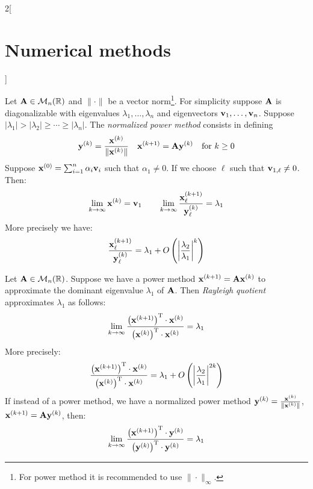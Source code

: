\documentclass[../../../main.tex]{subfiles}
\begin{document}
\begin{multicols}{2}[\section{Numerical methods}]
\begin{method}
    \end{method}
    \begin{method}
        Let $\boldsymbol{\mathrm{A}}\in\mathcal{M}_n(\mathbb{R})$ and $\|\cdot\|$ be a vector norm\footnote{For power method it is recommended to use $\|\cdot\|_\infty$.}. For simplicity suppose $\boldsymbol{\mathrm{A}}$ is diagonalizable with eigenvalues $\lambda_1,\ldots,\lambda_n$ and eigenvectors $\boldsymbol{\mathrm{v}}_1,\ldots,\boldsymbol{\mathrm{v}}_n$. Suppose $|\lambda_1|>|\lambda_2|\geq\cdots\geq|\lambda_n|$. The \textit{normalized power method} consists in defining $$\boldsymbol{\mathrm{y}}^{(k)}=\frac{\boldsymbol{\mathrm{x}}^{(k)}}{\|\boldsymbol{\mathrm{x}}^{(k)}\|}\quad\boldsymbol{\mathrm{x}}^{(k+1)}=\boldsymbol{\mathrm{A}}\boldsymbol{\mathrm{y}}^{(k)}\quad\text{for }k\geq 0$$ Suppose $\boldsymbol{\mathrm{x}}^{(0)}=\sum_{i=1}^n\alpha_i\boldsymbol{\mathrm{v}}_i$ such that $\alpha_1\ne0$. If we choose $\ell$ such that $\boldsymbol{\mathrm{v}}_{1,\ell}\ne0$. Then: $$\lim_{k\to\infty}\boldsymbol{\mathrm{x}}^{(k)}=\boldsymbol{\mathrm{v}}_1\qquad\lim_{k\to\infty}\frac{\boldsymbol{\mathrm{x}}_\ell^{(k+1)}}{\boldsymbol{\mathrm{y}}_\ell^{(k)}}=\lambda_1$$ More precisely we have: $$\frac{\boldsymbol{\mathrm{x}}_\ell^{(k+1)}}{\boldsymbol{\mathrm{y}}_\ell^{(k)}}=\lambda_1+O\left(\left|\frac{\lambda_2}{\lambda_1}\right|^k\right)$$
    \end{method}
    \begin{method}
        Let $\boldsymbol{\mathrm{A}}\in\mathcal{M}_n(\mathbb{R})$. Suppose we have a power method $\boldsymbol{\mathrm{x}}^{(k+1)}=\boldsymbol{\mathrm{A}}\boldsymbol{\mathrm{x}}^{(k)}$ to approximate the dominant eigenvalue $\lambda_1$ of $\boldsymbol{\mathrm{A}}$. Then \textit{Rayleigh quotient} approximates $\lambda_1$ as follows: $$\lim_{k\to\infty}\frac{\left(\boldsymbol{\mathrm{x}}^{(k+1)}\right)^\mathrm{T}\cdot \boldsymbol{\mathrm{x}}^{(k)}}{\left(\boldsymbol{\mathrm{x}}^{(k)}\right)^\mathrm{T}\cdot\boldsymbol{\mathrm{x}}^{(k)}}=\lambda_1$$
        More precisely: $$\frac{\left(\boldsymbol{\mathrm{x}}^{(k+1)}\right)^\mathrm{T}\cdot \boldsymbol{\mathrm{x}}^{(k)}}{\left(\boldsymbol{\mathrm{x}}^{(k)}\right)^\mathrm{T}\cdot\boldsymbol{\mathrm{x}}^{(k)}}=\lambda_1+O\left(\left|\frac{\lambda_2}{\lambda_1}\right|^{2k}\right)$$ If instead of a power method, we have a normalized power method $\boldsymbol{\mathrm{y}}^{(k)}=\frac{\boldsymbol{\mathrm{x}}^{(k)}}{\|\boldsymbol{\mathrm{x}}^{(k)}\|}$, $\boldsymbol{\mathrm{x}}^{(k+1)}=\boldsymbol{\mathrm{A}}\boldsymbol{\mathrm{y}}^{(k)}$, then: $$\lim_{k\to\infty}\frac{\left(\boldsymbol{\mathrm{x}}^{(k+1)}\right)^\mathrm{T}\cdot \boldsymbol{\mathrm{y}}^{(k)}}{\left(\boldsymbol{\mathrm{y}}^{(k)}\right)^\mathrm{T}\cdot\boldsymbol{\mathrm{y}}^{(k)}}=\lambda_1$$

\end{method}
\end{multicols}
\end{document}
